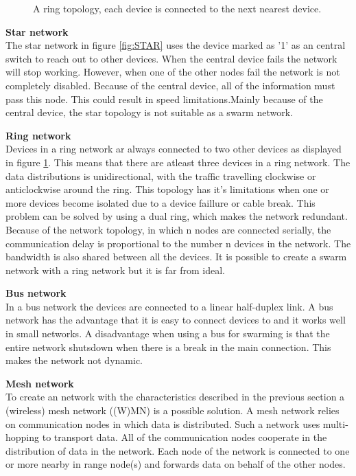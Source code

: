 \documentclass[10pt,a4paper]{article}
\begin{document}
\begin{figure}[H]
  \caption{A ring topology, each device is connected to the next nearest device.}\label{fig:RING}
\endminipage
\end{figure}

\textbf{Star network}\\
The star network in figure \ref{fig:STAR} uses the device marked as '1' as an central switch to reach out to other devices.\cite{starwiki} When the central device fails the network will stop working. However, when one of the other nodes fail the network is not completely disabled. Because of the central device, all of the information must pass this node. This could result in speed limitations.Mainly because of the central device, the star topology is not suitable as a swarm network. \cite{combook}


\textbf{Ring network}\\
Devices in a ring network ar always connected to two other devices as displayed in figure \ref{fig:RING}. This means that there are atleast three devices in a ring network. The data distributions is unidirectional, with the traffic travelling clockwise or anticlockwise around the ring. \cite{ringwiki} This topology has it's limitations when one or more devices become isolated due to a device faillure or cable break. This problem can be solved by using a dual ring, which makes the network redundant. Because of the network topology, in which n nodes are connected serially, the communication delay is proportional to the number n devices in the network. The bandwidth is also shared between all the devices. \cite{ringwiki} It is possible to create a swarm network with a ring network but it is far from ideal.

\textbf{Bus network}\\
In a bus network the devices are connected to a linear half-duplex link. \cite{bustopology} A bus network has the advantage that it is easy to connect devices to and it works well in small networks. A disadvantage when using a bus for swarming is that the entire network shutsdown when there is a break in the main connection. 
This makes the network not dynamic.

\textbf{Mesh network}\\
To create an network with the characteristics described in the previous section a (wireless) mesh network ((W)MN) is a possible solution. A mesh network relies on communication nodes in which data is distributed. Such a network uses multi-hopping to transport data.\cite{multi-hopwirelessnetworks} All of the communication nodes cooperate in the distribution of data in the network. Each node of the network is connected to one or more nearby in range node(s) and forwards data on behalf of the other nodes. \cite{meshnetworking} 
\end{document}
